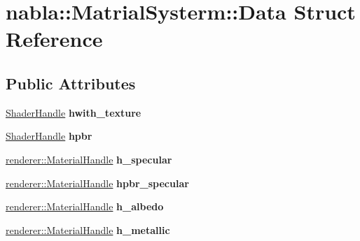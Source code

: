 \hypertarget{structnabla_1_1_matrial_systerm_1_1_data}{}\section{nabla\+::Matrial\+Systerm\+::Data Struct Reference}
\label{structnabla_1_1_matrial_systerm_1_1_data}
\subsection*{Public Attributes}
\begin{DoxyCompactItemize}
\item 
\mbox{\label{structnabla_1_1_matrial_systerm_1_1_data_a5c7289e700a7d54341af968cad9bb956}} 
\mbox{\hyperlink{classnabla_1_1renderer_1_1_handle}{Shader\+Handle}} {\bfseries hwith\+\_\+texture}
\item 
\mbox{\label{structnabla_1_1_matrial_systerm_1_1_data_a46907f9213d8ff71cb1000af5f35e433}} 
\mbox{\hyperlink{classnabla_1_1renderer_1_1_handle}{Shader\+Handle}} {\bfseries hpbr}
\item 
\mbox{\label{structnabla_1_1_matrial_systerm_1_1_data_ad11b5abb1f7ed06c28091251cf7da757}} 
\mbox{\hyperlink{classnabla_1_1renderer_1_1_handle}{renderer\+::\+Material\+Handle}} {\bfseries h\+\_\+specular}
\item 
\mbox{\label{structnabla_1_1_matrial_systerm_1_1_data_a554469adcc21f04ae6266322cc980a59}} 
\mbox{\hyperlink{classnabla_1_1renderer_1_1_handle}{renderer\+::\+Material\+Handle}} {\bfseries hpbr\+\_\+specular}
\item 
\mbox{\label{structnabla_1_1_matrial_systerm_1_1_data_aea46695697a7de1ee27fc96cbc28d999}} 
\mbox{\hyperlink{classnabla_1_1renderer_1_1_handle}{renderer\+::\+Material\+Handle}} {\bfseries h\+\_\+albedo}
\item 
\mbox{\label{structnabla_1_1_matrial_systerm_1_1_data_a43c2764d106a4e089e416226239260c3}} 
\mbox{\hyperlink{classnabla_1_1renderer_1_1_handle}{renderer\+::\+Material\+Handle}} {\bfseries h\+\_\+metallic}

\end{DoxyCompactItemize}
